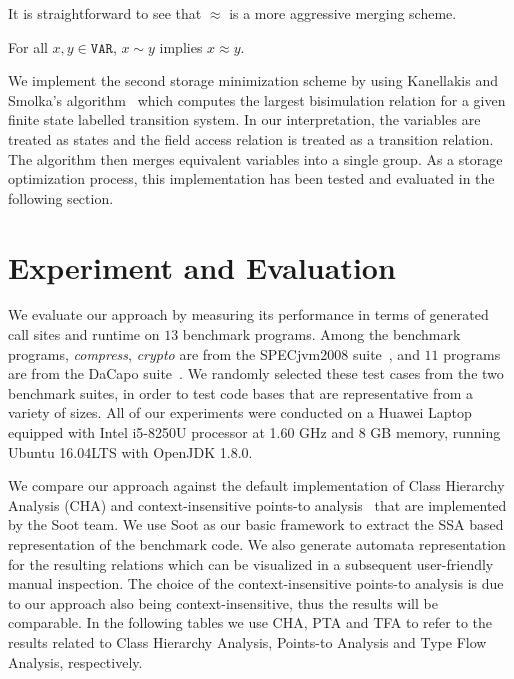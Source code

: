 \documentclass{llncs}
\newcommand\Var{\mathtt{VAR}}
\begin{document}
It is straightforward to see that $\approx$ is a more aggressive merging scheme.
\begin{lemma}\label{lem:bisimilar}
For all $x,y\in\Var$, $x\sim y$ implies $x\approx y$.
\end{lemma}


We implement the second storage minimization scheme by using Kanellakis and Smolka's algorithm~\cite{Kanellakis90} which computes the largest bisimulation relation for a given finite state labelled transition system. In our interpretation, the variables are treated as states and the field access relation is treated as a transition relation. The algorithm then merges equivalent variables into a single group. As a storage optimization process, this implementation has been tested and evaluated in the following section.


\section{Experiment and Evaluation}\label{sec:experiment}

We evaluate our approach by measuring its performance in terms of generated call sites and runtime on $13$ benchmark programs. Among the benchmark programs, \textit{compress}, \textit{crypto} are from the SPECjvm2008 suite~\cite{specjvm}, and $11$ programs are from the DaCapo suite~\cite{Blackburn2006}. We randomly selected these test cases from the two benchmark suites, in order to test code bases that are representative from a variety of sizes.
All of our experiments were conducted on a Huawei Laptop equipped with Intel i5-8250U processor at 1.60 GHz and 8 GB memory, running Ubuntu 16.04LTS with OpenJDK 1.8.0.

We compare our approach against the default implementation of Class Hierarchy Analysis (CHA) and context-insensitive points-to analysis~\cite{Lhotak2003} that are implemented by the Soot team. We use Soot as our basic framework to extract the SSA based representation of the benchmark code. We also generate automata representation for the resulting relations which can be visualized in a subsequent user-friendly manual inspection. The choice of the context-insensitive points-to analysis is due to our approach also being context-insensitive, thus the results will be comparable. In the following tables we use CHA, PTA and TFA to refer to the results related to Class Hierarchy Analysis, Points-to Analysis and Type Flow Analysis, respectively.
\end{document}
